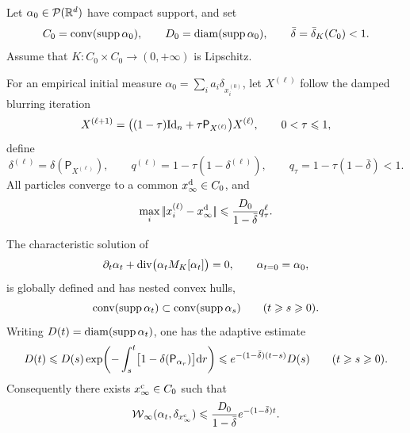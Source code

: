 \begin{thm}\label{thm-mean-shift-consensus}
	Let $\alpha_0\in\mathcal{P}(\mathbb{R}^d)$ have compact support, and set
	\[
		C_0=\operatorname{conv}(\operatorname{supp}\alpha_0),
		\qquad
		D_0=\operatorname{diam}(\operatorname{supp}\alpha_0),
		\qquad
		\bar\delta=\bar\delta_K(C_0)<1.
	\]
	Assume that $K:C_0\times C_0\to(0,+\infty)$ is Lipschitz.

	For an empirical initial measure $\alpha_0=\sum_i a_i\delta_{x_i^{(0)}}$, let $X^{(\ell)}$ follow the damped blurring iteration
	\[
		X^{(\ell+1)}
		=
		\bigl((1-\tau)\mathrm{Id}_n+\tau\mathsf P_{X^{(\ell)}}\bigr)X^{(\ell)},
		\qquad 0<\tau\leqslant1,
	\]
	define
	\[
		\delta^{(\ell)}=\delta(\mathsf P_{X^{(\ell)}}),
		\qquad
		q^{(\ell)}=1-\tau(1-\delta^{(\ell)}),
		\qquad
		q_\tau=1-\tau(1-\bar\delta)<1.
	\]
	All particles converge to a common $x_\infty^{\rm d}\in C_0$, and
	\[
		\max_i|\!| x_i^{(\ell)}-x_\infty^{\rm d} |\!|
		\leqslant
		\frac{D_0}{1-\bar\delta}q_\tau^\ell.
	\]

	The characteristic solution of
	\begin{equation}\label{eq-positive-mean-shift-pde}
		\partial_t\alpha_t+\operatorname{div}\bigl(\alpha_tM_K[\alpha_t]\bigr)=0,
		\qquad
		\alpha_{t=0}=\alpha_0,
	\end{equation}
	is globally defined and has nested convex hulls,
	\[
		\operatorname{conv}(\operatorname{supp}\alpha_t)
		\subset
		\operatorname{conv}(\operatorname{supp}\alpha_s)
		\qquad (t\geqslant s\geqslant0).
	\]
	Writing $D(t)=\operatorname{diam}(\operatorname{supp}\alpha_t)$, one has the adaptive estimate
	\begin{equation}\label{eq-mean-shift-diameter-contraction}
		D(t)
		\leqslant
		D(s)\exp\!\left(-\int_s^t\bigl[1-\delta(\mathsf P_{\alpha_r})\bigr]\mathrm{d} r\right)
		\leqslant
		e^{-(1-\bar\delta)(t-s)}D(s)
		\qquad (t\geqslant s\geqslant0).
	\end{equation}
	Consequently there exists $x_\infty^{\rm c}\in C_0$ such that
	\begin{equation}\label{eq-mean-shift-dirac-convergence}
		\operatorname{\mathcal{W}}_\infty(\alpha_t,\delta_{x_\infty^{\rm c}})
		\leqslant
		\frac{D_0}{1-\bar\delta}e^{-(1-\bar\delta)t}.
	\end{equation}
\end{thm}

